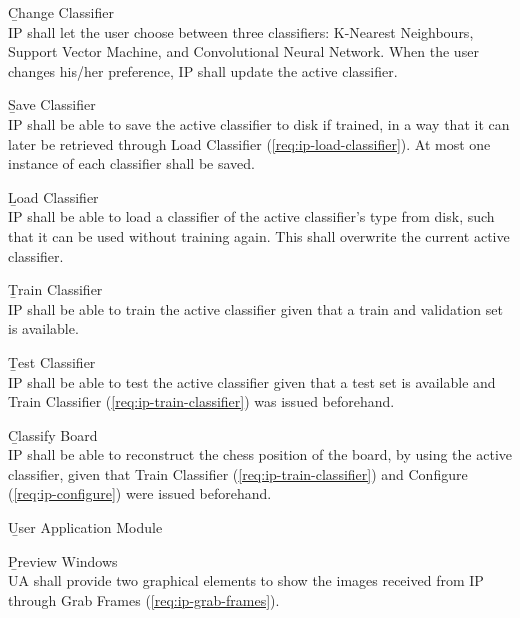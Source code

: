 \begin{enumeratenum}
\begin{enumeratenum}
            \item \b{Change Classifier} \label{req:ip-change-classifier}\\
            IP shall let the user choose between three classifiers: K-Nearest Neighbours, Support Vector Machine, and Convolutional Neural Network. When the user changes his/her preference, IP shall update the active classifier.

            \item \b{Save Classifier} \label{req:ip-save-classifier}\\
            IP shall be able to save the active classifier to disk if trained, in a way that it can later be retrieved through Load Classifier (\ref{req:ip-load-classifier}). At most one instance of each classifier shall be saved.

            \item \b{Load Classifier} \label{req:ip-load-classifier}\\
            IP shall be able to load a classifier of the active classifier's type from disk, such that it can be used without training again. This shall overwrite the current active classifier.

            \item \b{Train Classifier} \label{req:ip-train-classifier}\\
            IP shall be able to train the active classifier given that a train and validation set is available.

            \item \b{Test Classifier} \label{req:ip-test-classifier}\\
            IP shall be able to test the active classifier given that a test set is available and Train Classifier (\ref{req:ip-train-classifier}) was issued beforehand.

            \item \b{Classify Board} \label{req:ip-classify-board}\\
            IP shall be able to reconstruct the chess position of the board, by using the active classifier, given that Train Classifier (\ref{req:ip-train-classifier}) and Configure (\ref{req:ip-configure}) were issued beforehand.
        \end{enumeratenum}

    \item {\b{User Application Module}}
        \begin{enumeratenum}
            \item \b{Preview Windows} \label{req:ua-preview-windows} \\
            UA shall provide two graphical elements to show the images received from IP through Grab Frames (\ref{req:ip-grab-frames}).


\end{enumeratenum}
\end{enumeratenum}
